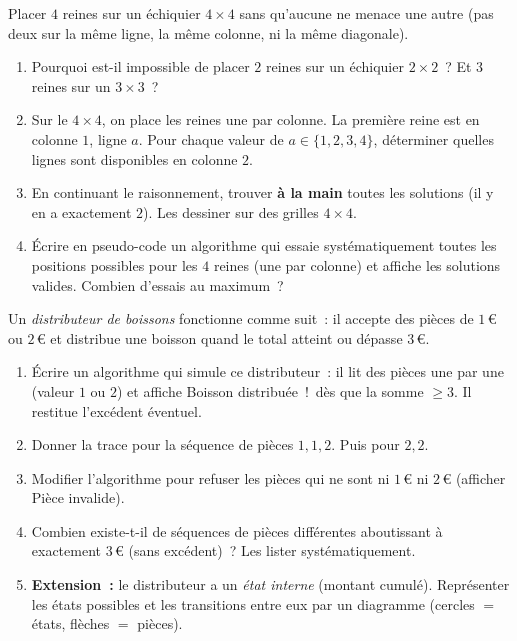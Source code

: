 \begin{challenge}
Placer $4$ reines sur un \'echiquier $4\times4$ sans qu'aucune ne menace
une autre (pas deux sur la m\^eme ligne, la m\^eme colonne, ni la m\^eme diagonale).
\begin{enumerate}
  \item Pourquoi est-il impossible de placer $2$ reines sur un \'echiquier
        $2\times2$~? Et $3$ reines sur un $3\times3$~?
  \item Sur le $4\times4$, on place les reines une par colonne.
        La premi\`ere reine est en colonne $1$, ligne $a$.
        Pour chaque valeur de $a\in\{1,2,3,4\}$, d\'eterminer
        quelles lignes sont disponibles en colonne $2$.
  \item En continuant le raisonnement, trouver \textbf{\`a la main}
        toutes les solutions (il y en a exactement $2$).
        Les dessiner sur des grilles $4\times4$.
  \item \'Ecrire en pseudo-code un algorithme qui essaie syst\'ematiquement
        toutes les positions possibles pour les $4$ reines
        (une par colonne) et affiche les solutions valides.
        Combien d'essais au maximum~?
\end{enumerate}
\end{challenge}

\begin{challenge}
Un \emph{distributeur de boissons} fonctionne comme suit~:
il accepte des pi\`eces de $1$\,\euro{} ou $2$\,\euro{}
et distribue une boisson quand le total atteint ou d\'epasse $3$\,\euro{}.
\begin{enumerate}
  \item \'Ecrire un algorithme qui simule ce distributeur~: il lit
        des pi\`eces une par une (valeur $1$ ou $2$) et affiche
        \og Boisson distribu\'ee~!\fg\ d\`es que la somme $\geq 3$.
        Il restitue l'exc\'edent \'eventuel.
  \item Donner la trace pour la s\'equence de pi\`eces $1, 1, 2$.
        Puis pour $2, 2$.
  \item Modifier l'algorithme pour refuser les pi\`eces qui ne sont
        ni $1$\,\euro{} ni $2$\,\euro{} (afficher \og Pi\`ece invalide\fg).
  \item Combien existe-t-il de s\'equences de pi\`eces diff\'erentes
        aboutissant \`a exactement $3$\,\euro{} (sans exc\'edent)~?
        Les lister syst\'ematiquement.
  \item \textbf{Extension~:} le distributeur a un \emph{\'etat interne}
        (montant cumul\'e). Repr\'esenter les \'etats possibles
        et les transitions entre eux par un diagramme
        (cercles $=$ \'etats, fl\`eches $=$ pi\`eces).
\end{enumerate}
\end{challenge}

